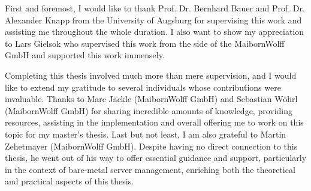         First and foremost, I would like to thank Prof. Dr. Bernhard Bauer and Prof. Dr. Alexander Knapp from the University of Augsburg for supervising this work and assisting me throughout the whole duration. I also want to show my appreciation to Lars Gielsok who supervised this work from the side of the MaibornWolff GmbH and supported this work immensely.\newline

        Completing this thesis involved much more than mere supervision, and I would like to extend my gratitude to several individuals whose contributions were invaluable. Thanks to Marc Jäckle (MaibornWolff GmbH) and Sebastian Wöhrl (MaibornWolff GmbH) for sharing incredible amounts of knowledge, providing resources, assisting in the implementation and overall offering me to work on this topic for my master's thesis. Last but not least, I am also grateful to Martin Zehetmayer (MaibornWolff GmbH). Despite having no direct connection to this thesis, he went out of his way to offer essential guidance and support, particularly in the context of bare-metal server management, enriching both the theoretical and practical aspects of this thesis.

        